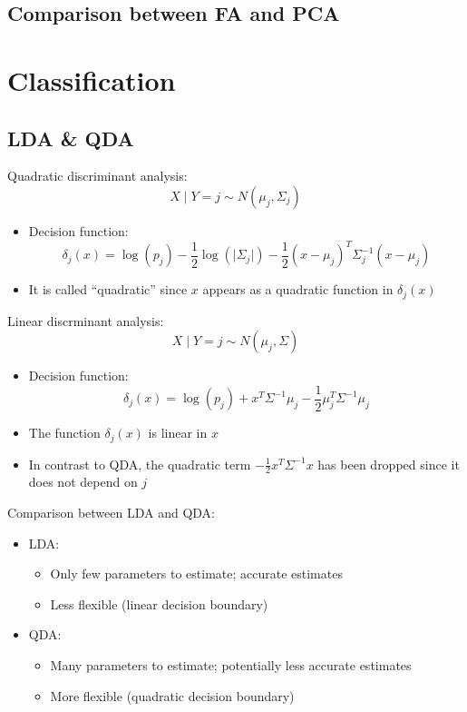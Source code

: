 \documentclass[a4paper]{article}
\begin{document}
\subsection{Comparison between FA and PCA}

\section{Classification}

\subsection{LDA \& QDA}

Quadratic discriminant analysis:
\[X\mid Y=j \sim N(\mu_j,\Sigma_j) \]
\begin{itemize}
    \item Decision function:
    \[\delta_j(x)=\log(p_j)-\frac{1}{2}\log(\lvert\Sigma_j\rvert)-\frac{1}{2}(x-\mu_j)^T\Sigma_j^{-1}(x-\mu_j) \]
    \item It is called ``quadratic'' since $x$ appears as a quadratic function in $\delta_j(x)$
\end{itemize}

Linear discrminant analysis:
\[X\mid Y=j \sim N(\mu_j,\Sigma) \]
\begin{itemize}
    \item Decision function:
    \[\delta_j(x)=\log(p_j)+x^T\Sigma^{-1}\mu_j-\frac{1}{2}\mu_j^T\Sigma^{-1}\mu_j \]
    \item The function $\delta_j(x)$ is linear in $x$
    \item In contrast to QDA, the quadratic term $-\frac{1}{2}x^T\Sigma^{-1}x$ has been dropped since it does not depend on $j$
\end{itemize}

Comparison between LDA and QDA:
\begin{itemize}
    \item LDA:
    \begin{itemize}
        \item Only few parameters to estimate; accurate estimates
        \item Less flexible (linear decision boundary)
    \end{itemize}
    \item QDA:
    \begin{itemize}
        \item Many parameters to estimate; potentially less accurate estimates
        \item More flexible (quadratic decision boundary)
    \end{itemize}
\end{itemize}
\end{document}
